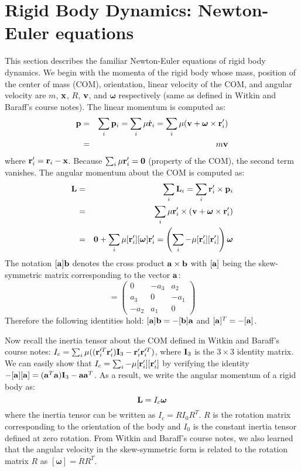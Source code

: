 \section{Rigid Body Dynamics: Newton-Euler equations}
This section describes the familiar Newton-Euler equations of rigid
body dynamics. We begin with the momenta of the rigid body whose mass,
position of the center of mass (COM), orientation, linear velocity of
the COM, and angular velocity are $m$, $\mathbf{x}$, $R$, $\mathbf{v}$, and
$\bm{\omega}$ respectively (same as defined in Witkin and Baraff's
course notes). The linear momentum  is computed as:
\begin{eqnarray}
\mathbf{p} &=& \sum_i \mathbf{p}_i = \sum_i \mathbf{\mu} \dot{\mathbf{r}}_i = \sum_i  \mathbf{\mu} (\mathbf{v} + \bm{\omega}
    \times \mathbf{r}_i') \nonumber \\
 &=& m \mathbf{v}
\end{eqnarray}
where $\mathbf{r}_i' = \mathbf{r}_i - \mathbf{x}$. Because $\sum_i \mathbf{\mu}
\mathbf{r}_i' = \mathbf{0}$ (property of the COM), the second term vanishes. The angular momentum  about the COM is computed as:
\begin{eqnarray}
\nonumber
\mathbf{L} & = & \sum_i \mathbf{L}_i  = \sum_i \mathbf{r}_i' \times \mathbf{p}_i\\
\nonumber
& = & \sum_i \mathbf{\mu} \mathbf{r}_i' \times (\mathbf{v} + \bm{\omega} \times \mathbf{r}_i')\\
&= & \mathbf{0} + \sum_i \mathbf{\mu} [\mathbf{r}_i'][\bm{\omega}]\mathbf{r}_i' = \left ( \sum_i -\mathbf{\mu} [\mathbf{r}_i'][\mathbf{r}_i'] \right )\bm{\omega}
\end{eqnarray}
The notation $[\mathbf{a}] \mathbf{b}$ denotes the cross product $\mathbf{a}\times \mathbf{b}$ with $[\mathbf{a}]$ being the skew-symmetric matrix corresponding to the vector $\mathbf{a}$:
\begin{equation}
[\vc{a}] = 
\begin{pmatrix}
0 & -a_3 & a_2\\
a_3&  0 & -a_1\\
-a_2 & a_1 & 0
\end{pmatrix}
\end{equation}
Therefore the following identities hold: $[\mathbf{a}]\mathbf{b} = -[\mathbf{b}]\mathbf{a}$ and $[\mathbf{a}]^T = -[\mathbf{a}]$.

Now recall the inertia tensor about the COM defined in Witkin and
Baraff's course notes: $I_c = \sum_i \mathbf{\mu} ((\mathbf{r}_i'^T
\mathbf{r}_i')\mathbf{I}_3 - \mathbf{r}_i' \mathbf{r}_i'^T)$, where $\mathbf{I}_3$ is the $3\times 3$
identity matrix. We can easily show that
$I_c = \sum_i -\mathbf{\mu} [\mathbf{r}_i'][\mathbf{r}_i']$ by verifying the
identity $-[\mathbf{a}][\mathbf{a}] = (\mathbf{a}^T\mathbf{a}) \mathbf{I}_3  -
\mathbf{a}\mathbf{a}^T$. As a result, we write the angular momentum of a rigid body as:
\begin{equation}
\mathbf{L} = I_c \bm{\omega}
\end{equation}
where the inertia tensor can be written as $I_c = RI_0R^T$. $R$ is the rotation matrix corresponding to the orientation of the body and $I_0$ is the constant inertia tensor defined at zero rotation. From Witkin and Baraff's course notes, we also learned that the angular velocity in the skew-symmetric form is related to the rotation matrix $R$ as $[\bm{\omega}] = \dot{R}R^T$.

